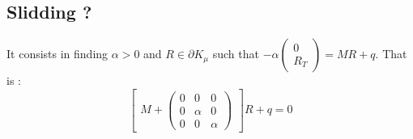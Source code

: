 

\subsection{Slidding ?}
It consists in finding $\alpha >0$ and $R \in \partial K_{\mu}$ such that $-\alpha \left(\begin{array}{l} 0\\ R_T\end{array}\right)=MR+q$. That is :
  \begin{equation}
\label{eq_quartic1}
\left[\begin{array}{c}
M+ \left(\begin{array}{ccc} 0&0&0\\ 0&\alpha&0 \\ 0&0&\alpha \end{array}\right)
\end{array}\right]R+q=0
\end{equation}

